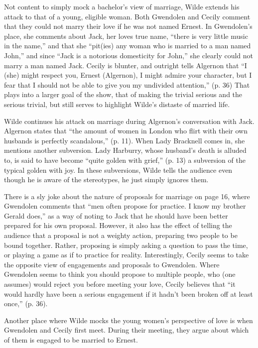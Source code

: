 \documentclass[12pt]{article}[titlepage]
\newcommand{\say}[1]{``#1''}
\newcommand{\1}{\={a}}
\newcommand{\2}{\={e}}
\newcommand{\3}{\={\i}}
\newcommand{\4}{\=o}
\newcommand{\5}{\=u}
\newcommand{\6}{\={A}}
\renewcommand{\,}{\textsuperscript{,}}
\begin{document}
Not content to simply mock a bachelor's view of marriage, Wilde extends his attack to that of a young, eligible woman.
Both Gwendolen and Cecily comment that they could not marry their love if he was not named Ernest.
In Gwendolen's place, she comments about Jack, her loves true name, \say{there is very little music in the name,} and that she \say{pit(ies) any woman who is married to a man named John,} and since \say{Jack is a notorious domesticity for John,} she clearly could not marry a man named Jack.
Cecily is blunter, and outright tells Algernon that \say{I (she) might respect you, Ernest (Algernon), I might admire your character, but I fear that I should not be able to give you my undivided attention,} (p. 36)
That plays into a larger goal of the show, that of making the trivial serious and the serious trivial, but still serves to highlight Wilde's distaste of married life.

Wilde continues his attack on marriage during Algernon's conversation with Jack.
Algernon states that \say{the amount of women in London who flirt with their own husbands is perfectly scandalous,} (p. 11).
When Lady Bracknell comes in, she mentions another subversion.
Lady Harburry, whose husband's death is alluded to, is said to have become \say{quite golden with grief,} (p. 13) a subversion of the typical golden with joy.
In these subversions, Wilde tells the audience even though he is aware of the stereotypes, he just simply ignores them.

There is a sly joke about the nature of proposals for marriage on page 16, where Gwendolen comments that \say{men often propose for practice. I know my brother Gerald does,} as a way of noting to Jack that he should have been better prepared for his own proposal.
However, it also has the effect of telling the audience that a proposal is not a weighty action, preparing two people to be bound together.
Rather, proposing is simply asking a question to pass the time, or playing a game as if to practice for reality.
Interestingly, Cecily seems to take the opposite view of engagements and proposals to Gwendolen.
Where Gwendolen seems to think you should propose to multiple people, who (one assumes) would reject you before meeting your love, Cecily believes that \say{it would hardly have been a serious engagement if it hadn't been broken off at least once,} (p. 36).

Another place where Wilde mocks the young women's perspective of love is when Gwendolen and Cecily first meet.
During their meeting, they argue about which of them is engaged to be married to Ernest.
\end{document}
